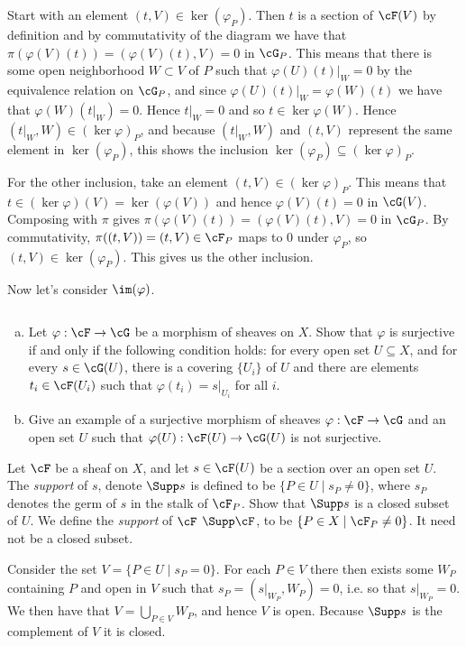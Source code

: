 \begin{homework}[e]
\begin{prf}
\begin{enumerate}[(a)]
\begin{center}
				\end{center}
				Start with an element $(t,V) \in \ker (\varphi_P)$. Then $t$ is a section of $\cF(V)$ by definition and by commutativity of the diagram we have that $\pi(\varphi(V)(t)) = (\varphi(V)(t),V) = 0$ in $\cG_P$. This means that there is some open neighborhood $W\subset V$ of $P$ such that $\varphi(U)(t)|_W = 0$ by the equivalence relation on $\cG_P$, and since $\varphi(U)(t)|_W = \varphi(W)(t)$ we have that $\varphi(W)(t|_W) = 0$. Hence $t|_W = 0$ and so $t \in \ker\varphi(W)$. Hence $(t|_W,W) \in (\ker \varphi)_P$, and because $(t|_W,W)$ and $(t,V)$ represent the same element in $\ker (\varphi_P)$, this shows the inclusion $\ker(\varphi_P) \subseteq (\ker \varphi)_P$.

				For the other inclusion, take an element $(t,V) \in (\ker\varphi)_P$. This means that $t \in (\ker\varphi)(V) = \ker(\varphi(V))$ and hence $\varphi(V)(t) = 0$ in $\cG(V)$. Composing with $\pi$ gives $\pi(\varphi(V)(t)) = (\varphi(V)(t),V) = 0$ in $\cG_P$. By commutativity, $\pi((t,V)) = (t,V)\in \cF_P$ maps to $0$ under $\varphi_P$, so $(t,V)\in \ker(\varphi_P)$. This gives us the other inclusion.

				\bigskip

				Now let's consider $\im(\varphi)$.
		\end{enumerate}
	\end{prf}
	\prob $ $
	\begin{enumerate}[(a)]
		\item  Let $\varphi:\cF\to \cG$ be a morphism of sheaves on $X$. Show that $\varphi$ is surjective if and only if the following condition holds: for every open set $U\subseteq X$, and for every $s \in \cG(U)$, there is a covering $\{U_i\}$ of $U$ and there are elements $t_i \in \cF(U_i)$ such that $\varphi(t_i) = s|_{U_i}$ for all $i$.
		\item Give an example of a surjective morphism of sheaves $\varphi:\cF\to \cG$ and an open set $U$ such that $\varphi(U):\cF(U)\to \cG(U)$ is not surjective.
	\end{enumerate}
	 Let $\cF$ be a sheaf on $X$, and let $s \in \cF(U)$ be a section over an open set $U$. The \emph{support} of $s$, denote $\Supp s$ is defined to be $\{P \in U \mid s_P \neq 0\}$, where $s_P$ denotes the germ of $s$ in the stalk of $\cF_P$. Show that $\Supp s$ is a closed subset of $U$. We define the \emph{support} of $\cF$ $\Supp \cF$, to be $\{P\in X \mid \cF_P \neq 0\}$. It need not be a closed subset.
	\begin{prf}
		Consider the set $V = \{P \in U \mid s_P = 0\}$. For each $P\in V$ there then exists some $W_P$ containing $P$ and open in $V$ such that $s_P = (s|_{W_P}, W_P) = 0$, i.e. so that $s|_{W_P} = 0$. We then have that $V = \bigcup_{P \in V} W_P$, and hence $V$ is open. Because $\Supp s$ is the complement of $V$ it is closed.


\end{prf}
\end{homework}
